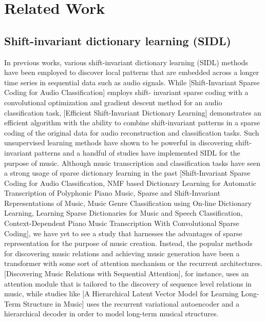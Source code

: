 \documentclass[11pt,a4paper]{article}
\begin{document}
\section{Related Work}

\subsection{ Shift-invariant dictionary learning (SIDL)  }

In previous works, various shift-invariant dictionary learning (SIDL) methods have been employed to discover local patterns that are embedded across a longer time series in sequential data such as audio signals. While [Shift-Invariant Sparse Coding for Audio Classification] employs shift-
invariant sparse coding with a convolutional optimization and gradient descent method for an audio classification task, [Efficient Shift-Invariant Dictionary Learning] demonstrates an efficient algorithm with the ability to combine shift-invariant patterns in a sparse coding of the original data for audio reconstruction and classification tasks. Such unsupervised learning methods have shown to be powerful in discovering shift-invariant patterns and a handful of studies have implemented SIDL for the purpose of music. Although music transcription and classification tasks have seen a strong usage of sparse dictionary learning in the past [Shift-Invariant Sparse Coding for Audio Classification, NMF based Dictionary Learning for Automatic Transcription of Polyphonic Piano Music, Sparse and Shift-Invariant Representations of Music, Music Genre Classification using On-line Dictionary Learning, Learning Sparse Dictionaries for Music and Speech Classification, Context-Dependent Piano Music Transcription With Convolutional Sparse Coding], we have yet to see a study that harnesses the advantages of sparse representation for the purpose of music creation. Instead, the popular methods for discovering music relations and achieving music generation have been a transformer with some sort of attention mechanism or the recurrent architectures. [Discovering Music Relations with Sequential Attention], for instance, uses an attention module that is tailored to the discovery of sequence level relations in music, while studies like [A Hierarchical Latent Vector Model for Learning Long-Term Structure in Music] uses the recurrent variational autoencoder and a hierarchical decoder in order to model long-term musical structures. 
\end{document}
